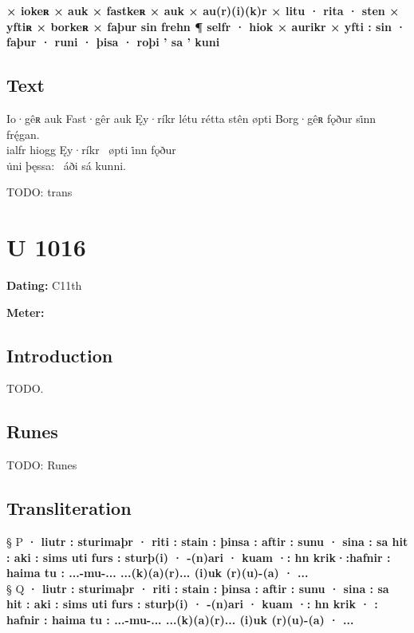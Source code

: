 \textbf{× iokeʀ × auk × fastkeʀ × auk × au(r)(i)(k)r × litu · rita · sten × yftiʀ × borkeʀ × faþur sin frehn ¶ selfr · hiok × aurikr × yfti : sin · faþur · runi · þisa · roþi ’ sa ’ kuni}

\subsection{Text}

\bpg\bpa[0]%
\startsub Io·gêʀ auk Fast·gêr auk Ęy·ríkr létu rétta stên øpti Borg·gêʀ fǫður si̇nn frę́gan.\endsub \\
ialfr hiogg Ęy·ríkr \hld\ øpti i̇nn fǫður \\
u̇ni þęssa: \hld\ áði sá kunni.\epa

\bpb TODO: trans\epb\epg

\sectionline\clearpage


\section{U 1016}

\begin{flushright}%
\textbf{Dating:} C11th

\textbf{Meter:} \Fornyrdislag
\end{flushright}%

\subsection{Introduction}

TODO.

\subsection{Runes}

TODO: Runes%

\subsection{Transliteration}

§ P \textbf{· liutr : sturimaþr · riti : stain : þinsa : aftir : sunu · sina : sa hit : aki : sims uti furs : sturþ(i) · -(n)ari · kuam ·: hn krik·:hafnir : haima tu : ...-mu-... ...(k)(a)(r)... (i)uk (r)(u)-(a) · ...} \\
§ Q \textbf{· liutr : sturimaþr · riti : stain : þinsa : aftir : sunu · sina : sa hit : aki : sims uti furs : sturþ(i) · -(n)ari · kuam ·: hn krik · : hafnir : haima tu : ...-mu-... ...(k)(a)(r)... (i)uk (r)(u)-(a) · ...}

